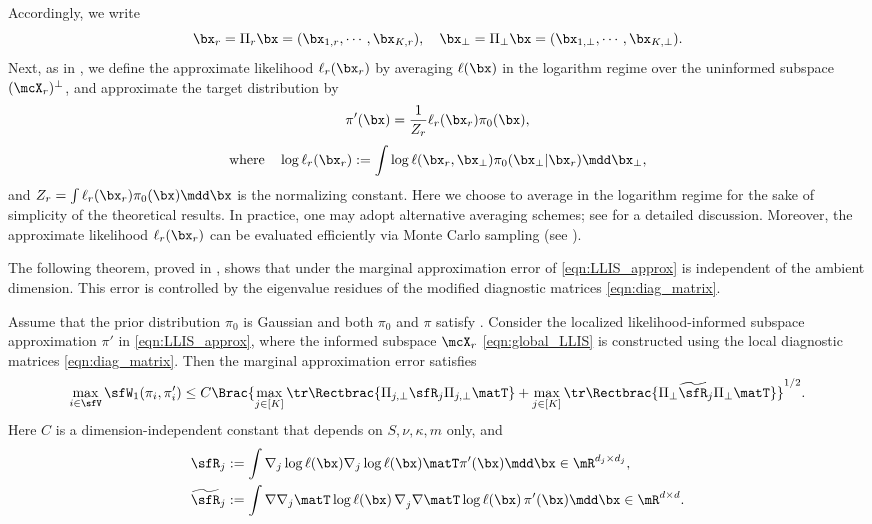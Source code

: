 \documentclass[11pt]{article}
\begin{document}
Accordingly, we write 
\begin{equation}
\label{eqn:global_decomp}
    \bx_r = \Pi_r \bx = (\bx_{1,r},\cdots,\bx_{K,r}), \quad \bx_\bot = \Pi_\bot \bx = (\bx_{1,\bot},\cdots,\bx_{K,\bot}).
\end{equation}
Next, as in \cite{MR4474562}, we define the approximate likelihood $\ell_r(\bx_r)$ by averaging $\ell(\bx)$ in the logarithm regime over the uninformed subspace $(\mcX_r)^\bot$, and approximate the target distribution by
\begin{equation}
\label{eqn:LLIS_approx}
    \pi'(\bx) = \frac{1}{Z_r} \ell_r(\bx_r) \pi_0(\bx),
\end{equation}
\begin{equation}
\label{eqn:LLIS_approx2}
    \text{where} \quad \log \ell_r(\bx_r) := \int \log \ell (\bx_r,\bx_\bot) \pi_0(\bx_\bot|\bx_r) \mdd \bx_\bot,
\end{equation}
and $Z_r = \int \ell_r(\bx_r) \pi_0(\bx) \mdd \bx$ is the normalizing constant.
%
Here we choose to average in the logarithm regime for the sake of simplicity of the theoretical results.
%
In practice, one may adopt alternative averaging schemes; see \cite{MR4474562} for a detailed discussion.
Moreover, the approximate likelihood \(\ell_r(\bx_r)\) can be evaluated efficiently via Monte Carlo sampling (see \cite{MR3274599,MR4474562}).


The following theorem, proved in , shows that under  the marginal approximation error of \eqref{eqn:LLIS_approx} is independent of the ambient dimension. This error is controlled by the eigenvalue residues of the modified diagnostic matrices \eqref{eqn:diag_matrix}. 

\begin{thm}
\label{thm:LLIS_approx}
Assume that the prior distribution $\pi_0$ is Gaussian and both $\pi_0$ and $\pi$ satisfy .
Consider the localized likelihood-informed subspace approximation $\pi'$ in \eqref{eqn:LLIS_approx}, where the informed subspace $\mcX_r$ \eqref{eqn:global_LLIS} is constructed using the local diagnostic matrices \eqref{eqn:diag_matrix}.
%
Then the marginal approximation error satisfies
\begin{equation}
\label{eqn:LIS_approx}
    \max_{i\in \sfV} \sfW_1(\pi_i,\pi_i') \le C \Brac{ \max_{j \in [K]} \tr \Rectbrac{ \Pi_{j,\bot} \sfR_j \Pi_{j,\bot}\matT } + \max_{j \in [K]} \tr \Rectbrac{ \Pi_\bot \widetilde{\sfR}_j \Pi_\bot\matT } }^{1/2}.
\end{equation}
Here $C$ is a dimension-independent constant that depends on $S,\nu,\kappa,m$ only, and
\begin{equation}
\label{eqn:mat_resi}
\begin{split}
    \sfR_j  & :=  \int \nabla_j \log \ell(\bx) \nabla_j \log \ell(\bx) \matT \pi'(\bx) \mdd \bx \in \mR^{d_j \times d_j},  \\
    \widetilde{\sfR}_j & := \int \nabla \nabla_j\matT \log \ell(\bx)\, \nabla_j^{} \nabla\matT \log \ell(\bx)\, \pi'(\bx) \mdd \bx \in \mR^{d \times d}.
\end{split}
\end{equation}
\end{thm}
\end{document}
